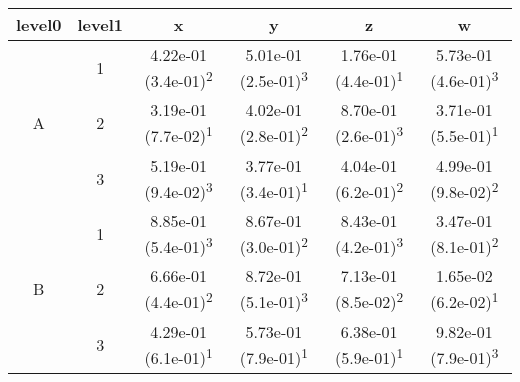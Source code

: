 \begin{tabular}{cccccc}
\toprule
level0 & level1&x&y&z&w\tabularnewline
\midrule
\multirow{3}{*}{A}&1& 4.22e-01 (3.4e-01)\textsuperscript{2}& 5.01e-01 (2.5e-01)\textsuperscript{3}& 1.76e-01 (4.4e-01)\textsuperscript{1}& 5.73e-01 (4.6e-01)\textsuperscript{3}\tabularnewline
&2& 3.19e-01 (7.7e-02)\textsuperscript{1}& 4.02e-01 (2.8e-01)\textsuperscript{2}& 8.70e-01 (2.6e-01)\textsuperscript{3}& 3.71e-01 (5.5e-01)\textsuperscript{1}\tabularnewline
&3& 5.19e-01 (9.4e-02)\textsuperscript{3}& 3.77e-01 (3.4e-01)\textsuperscript{1}& 4.04e-01 (6.2e-01)\textsuperscript{2}& 4.99e-01 (9.8e-02)\textsuperscript{2}\tabularnewline
\midrule
\multirow{3}{*}{B}&1& 8.85e-01 (5.4e-01)\textsuperscript{3}& 8.67e-01 (3.0e-01)\textsuperscript{2}& 8.43e-01 (4.2e-01)\textsuperscript{3}& 3.47e-01 (8.1e-01)\textsuperscript{2}\tabularnewline
&2& 6.66e-01 (4.4e-01)\textsuperscript{2}& 8.72e-01 (5.1e-01)\textsuperscript{3}& 7.13e-01 (8.5e-02)\textsuperscript{2}& 1.65e-02 (6.2e-02)\textsuperscript{1}\tabularnewline
&3& 4.29e-01 (6.1e-01)\textsuperscript{1}& 5.73e-01 (7.9e-01)\textsuperscript{1}& 6.38e-01 (5.9e-01)\textsuperscript{1}& 9.82e-01 (7.9e-01)\textsuperscript{3}\tabularnewline
\bottomrule
\end{tabular}
